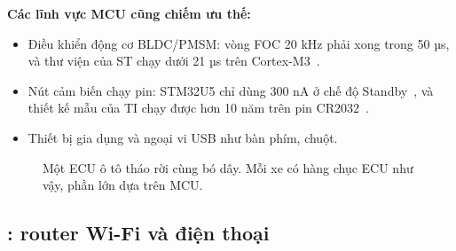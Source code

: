 \documentclass[11pt,a4paper]{article}
\begin{document}
\textbf{Các lĩnh vực MCU cũng chiếm ưu thế:}
\begin{itemize}
\item Điều khiển động cơ BLDC/PMSM: vòng FOC 20 kHz phải xong trong 50 µs, và thư viện của ST chạy dưới 21 µs trên Cortex-M3~\cite{st-motor}.
\item Nút cảm biến chạy pin: STM32U5 chỉ dùng 300 nA ở chế độ Standby~\cite{arrow}, và thiết kế mẫu của TI chạy được hơn 10 năm trên pin CR2032~\cite{ti-cr2032}.
\item Thiết bị gia dụng và ngoại vi USB như bàn phím, chuột.
\end{itemize}

\begin{figure}[htbp]
\centering
\begin{minipage}{0.45\linewidth}\centering
\end{minipage}
\caption{Một ECU ô tô tháo rời cùng bó dây. Mỗi xe có hàng chục ECU như vậy, phần lớn dựa trên MCU.}
\end{figure}

\subsection{\SoC: router Wi-Fi và điện thoại}
\end{document}
